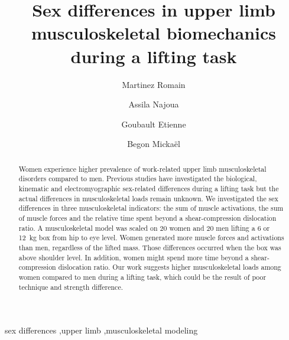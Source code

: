 \documentclass[preprint,review,12pt]{elsarticle}
\begin{document}
    \begin{frontmatter}

        \title{Sex differences in upper limb musculoskeletal biomechanics during a lifting task}


        \author[1]{Martinez Romain}
        \author[1]{Assila Najoua}
        \author[1]{Goubault Etienne}
        \author[1]{Begon Mickaël}

        \address[1]{School of Kinesiology and Exercise Science, Faculty of Medicine, University of Montreal}



        \begin{abstract}
            Women experience higher prevalence of work-related upper limb musculoskeletal disorders compared to men.
            Previous studies have investigated the biological, kinematic and electromyographic sex-related differences during a lifting task but the actual differences in musculoskeletal loads remain unknown.
            We investigated the sex differences in three musculoskeletal indicators: the sum of muscle activations, the sum of muscle forces and the relative time spent beyond a shear-compression dislocation ratio.
            A musculoskeletal model was scaled on 20 women and 20 men lifting a 6 or 12~kg box from hip to eye level.
            Women generated more muscle forces and activations than men, regardless of the lifted mass.
            Those differences occurred when the box was above shoulder level.
            In addition, women might spend more time beyond a shear-compression dislocation ratio.
            Our work suggests higher musculoskeletal loads among women compared to men during a lifting task, which could be the result of poor technique and strength difference.
        \end{abstract}

        \begin{keyword}
            sex differences \sep upper limb \sep musculoskeletal modeling
        \end{keyword}

    \end{frontmatter}
\end{document}
